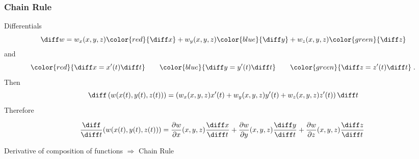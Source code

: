 \begin{frame}
  \frametitle{Chain Rule}
Differentials
%
\[
\diff w=w_x(x,y,z){\color{red}{\diff x}} +
w_y(x,y,z){\color{blue}{\diff y}}+
w_z(x,y,z){\color{green}{\diff z}}
\]
%
and
%
\[
{\color{red}{\diff x=x'(t)\diff t}} \qquad
{\color{blue}{\diff y = y'(t)\diff t}} \qquad
{\color{green}{\diff z=z'(t)\diff t}} \; .
\]
%
\pause Then
%
\[
\diff \left(w(x(t), y(t), z(t)) \right)= \left( w_x(x,y,z) x'(t) + w_y(x,y,z) y'(t) +
w_z(x,y,z) z'(t) \right) \diff t
\]
%
\pause
Therefore

\[\!\!\displaystyle
\frac{\diff }{\diff t}(w(x(t), y(t), z(t))) = \frac{\partial w}{\partial x}(x,y,z) \frac{\diff x}{\diff t} +
\frac{\partial w}{\partial y}(x,y,z) \frac{\diff y}{\diff t} +
\frac{\partial w}{\partial z}(x,y,z) \frac{\diff z}{\diff t}
\]

\pause
Derivative of composition of functions $\Longrightarrow$ \alert<1->{Chain Rule}
\end{frame}